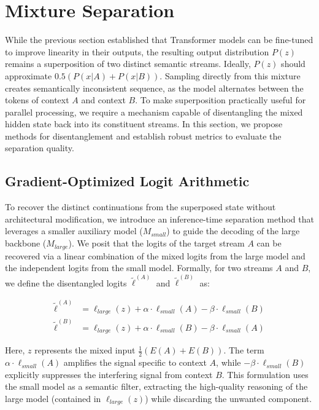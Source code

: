 \documentclass{article}
\theoremstyle{plain}
\theoremstyle{definition}
\theoremstyle{remark}
\begin{document}
\section{Mixture Separation}
\label{sec:mixture_separation}

While the previous section established that Transformer models can be fine-tuned to improve linearity in their outputs, the resulting output distribution $P(z)$ remains a superposition of two distinct semantic streams. Ideally, $P(z)$ should approximate $0.5(P(x|A) + P(x|B))$. Sampling directly from this mixture creates semantically inconsistent sequence, as the model alternates between the tokens of context $A$ and context $B$. To make superposition practically useful for parallel processing, we require a mechanism capable of disentangling the mixed hidden state back into its constituent streams. In this section, we propose methods for disentanglement and establish robust metrics to evaluate the separation quality.

\subsection{Gradient-Optimized Logit Arithmetic}

To recover the distinct continuations from the superposed state without architectural modification, we introduce an inference-time separation method that leverages a smaller auxiliary model ($M_{small}$) to guide the decoding of the large backbone ($M_{large}$). We posit that the logits of the target stream $A$ can be recovered via a linear combination of the mixed logits from the large model and the independent logits from the small model. Formally, for two streams $A$ and $B$, we define the disentangled logits $\tilde{\ell}^{(A)}$ and $\tilde{\ell}^{(B)}$ as:

\begin{align}
\tilde{\ell}^{(A)} &= \ell_{large}(z) + \alpha \cdot \ell_{small}(A) -  \beta \cdot \ell_{small}(B) \\
\tilde{\ell}^{(B)} &= \ell_{large}(z) + \alpha  \cdot \ell_{small}(B) -\beta \cdot \ell_{small}(A)
\end{align}

Here, $z$ represents the mixed input $\frac{1}{2}(E(A) + E(B))$. The term $\alpha \cdot \ell_{small}(A)$ amplifies the signal specific to context $A$, while $-\beta \cdot \ell_{small}(B)$ explicitly suppresses the interfering signal from context $B$. This formulation uses the small model as a semantic filter, extracting the high-quality reasoning of the large model (contained in $\ell_{large}(z)$) while discarding the unwanted component.
\end{document}
